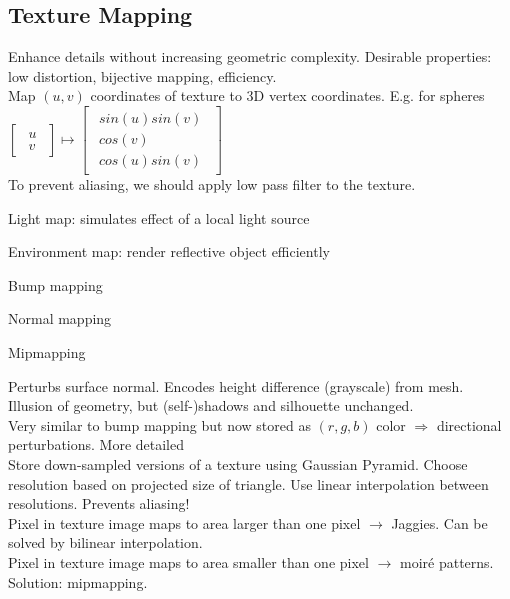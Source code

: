 \subsection*{Texture Mapping}
Enhance details without increasing geometric complexity. Desirable properties: low distortion, bijective mapping, efficiency. \\
 Map $(u,v)$ coordinates of texture to 3D vertex coordinates. E.g. for spheres
$\begin{bmatrix}
    \begin{smallmatrix}
        u \\ v
    \end{smallmatrix}    
\end{bmatrix} \mapsto 
\begin{bmatrix}
    \begin{smallmatrix}
        sin(u)sin(v) \\
        cos(v)\\
        cos(u)sin(v)
    \end{smallmatrix}
\end{bmatrix}$\\
 To prevent aliasing, we should apply low pass filter to the texture. \\
\begin{compactitem}
    \item Light map: simulates effect of a local light source
    \item Environment map: render reflective object efficiently
    \item Bump mapping
    \item Normal mapping
    \item Mipmapping
\end{compactitem}
Perturbs surface normal. Encodes height difference (grayscale) from mesh. Illusion of geometry, but (self-)shadows and silhouette unchanged. \\
Very similar to bump mapping but now stored as $(r,g,b)$ color $\Rightarrow$ directional perturbations. More detailed \\
Store down-sampled versions of a texture using Gaussian Pyramid. Choose resolution based on projected size of triangle. Use linear interpolation between resolutions. Prevents aliasing!\\
Pixel in texture image maps to area larger than one pixel $\rightarrow$ Jaggies. Can be solved by bilinear interpolation. \\
Pixel in texture image maps to area smaller than one pixel $\rightarrow$ moiré patterns. Solution: mipmapping.